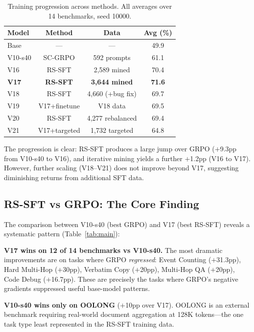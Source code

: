 \documentclass{article}
\begin{document}
\begin{table}[t]
\caption{Training progression across methods. All averages over 14 benchmarks, seed 10000.}
\label{tab:progression}
\vskip 0.15in
\begin{center}
\begin{small}
\begin{tabular}{lccc}
\toprule
Model & Method & Data & Avg (\%) \\
\midrule
Base & --- & --- & 49.9 \\
V10-s40 & SC-GRPO & 592 prompts & 61.1 \\
V16 & RS-SFT & 2,589 mined & 70.4 \\
\textbf{V17} & \textbf{RS-SFT} & \textbf{3,644 mined} & \textbf{71.6} \\
\midrule
V18 & RS-SFT & 4,660 (+bug fix) & 69.7 \\
V19 & V17+finetune & V18 data & 69.5 \\
V20 & RS-SFT & 4,277 rebalanced & 69.4 \\
V21 & V17+targeted & 1,732 targeted & 64.8 \\
\bottomrule
\end{tabular}
\end{small}
\end{center}
\vskip -0.15in
\end{table}

The progression is clear: RS-SFT produces a large jump over GRPO ($+$9.3pp from V10-s40 to V16), and iterative mining yields a further $+$1.2pp (V16 to V17). However, further scaling (V18--V21) does not improve beyond V17, suggesting diminishing returns from additional SFT data.

\subsection{RS-SFT vs GRPO: The Core Finding}
\label{sec:rs-sft-vs-grpo}

The comparison between V10-s40 (best GRPO) and V17 (best RS-SFT) reveals a systematic pattern (Table~\ref{tab:main}):

\textbf{V17 wins on 12 of 14 benchmarks vs V10-s40.} The most dramatic improvements are on tasks where GRPO \emph{regressed}: Event Counting ($+$31.3pp), Hard Multi-Hop ($+$30pp), Verbatim Copy ($+$20pp), Multi-Hop QA ($+$20pp), Code Debug ($+$16.7pp). These are precisely the tasks where GRPO's negative gradients suppressed useful base-model patterns.

\textbf{V10-s40 wins only on OOLONG} ($+$10pp over V17). OOLONG is an external benchmark requiring real-world document aggregation at 128K tokens---the one task type least represented in the RS-SFT training data.
\end{document}
